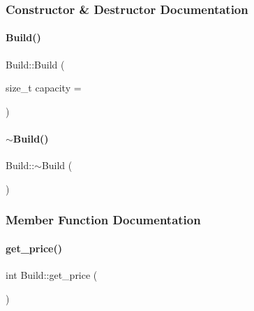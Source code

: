 \subsubsection{Constructor \& Destructor Documentation}
\mbox{\label{class_build_ab9b72c3479d483c0b452af30bb544de8}} 
\paragraph{\texorpdfstring{Build()}{Build()}}
{\footnotesize\ttfamily Build\+::\+Build (\begin{DoxyParamCaption}\item[{size\+\_\+t}]{capacity = {} }\end{DoxyParamCaption})\hspace{0.3cm}{\ttfamily [inline]}}

\mbox{\label{class_build_a8f1d400e9bc158b6339cc1785b18d07b}} 
\paragraph{\texorpdfstring{$\sim$Build()}{~Build()}}
{\footnotesize\ttfamily Build\+::$\sim$\+Build (\begin{DoxyParamCaption}{ }\end{DoxyParamCaption})\hspace{0.3cm}{\ttfamily [inline]}}



\subsubsection{Member Function Documentation}
\mbox{\label{class_build_aded745a17c7d6b569244cb377ff62a9c}} 
\paragraph{\texorpdfstring{get\_price()}{get\_price()}}
{\footnotesize\ttfamily int Build\+::get\+\_\+price (\begin{DoxyParamCaption}{ }\end{DoxyParamCaption})\hspace{0.3cm}{\ttfamily [inline]}}

\mbox{\label{class_build_a754a988f73da756210b083814986f2f1}} 
